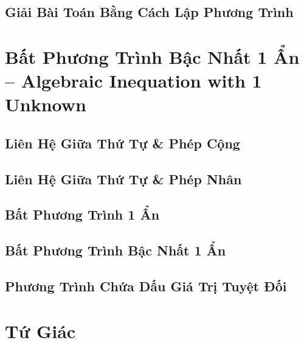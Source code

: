 \documentclass{article}
\numberwithin{equation}{section}
\begin{document}
\subsection{Giải Bài Toán Bằng Cách Lập Phương Trình}


\section{Bất Phương Trình Bậc Nhất 1 Ẩn -- Algebraic Inequation with 1 Unknown}

\subsection{Liên Hệ Giữa Thứ Tự \& Phép Cộng}


\subsection{Liên Hệ Giữa Thứ Tự \& Phép Nhân}


\subsection{Bất Phương Trình 1 Ẩn}


\subsection{Bất Phương Trình Bậc Nhất 1 Ẩn}


\subsection{Phương Trình Chứa Dấu Giá Trị Tuyệt Đối}


\section{Tứ Giác}
\end{document}
